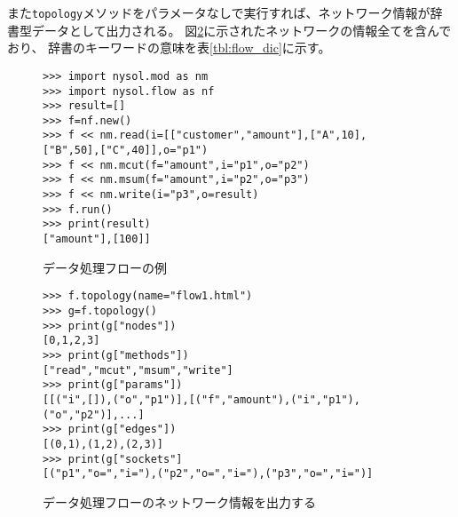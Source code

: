 また\verb|topology|メソッドをパラメータなしで実行すれば、ネットワーク情報が辞書型データとして出力される。
図\ref{code:flow1_topo}に示されたネットワークの情報全てを含んでおり、
辞書のキーワードの意味を表\ref{tbl:flow_dic}に示す。


\begin{figure}[htbp]
\begin{Verbatim}[baselinestretch=0.7,frame=single]
>>> import nysol.mod as nm
>>> import nysol.flow as nf
>>> result=[]
>>> f=nf.new()
>>> f << nm.read(i=[["customer","amount"],["A",10],["B",50],["C",40]],o="p1")
>>> f << nm.mcut(f="amount",i="p1",o="p2")
>>> f << nm.msum(f="amount",i="p2",o="p3")
>>> f << nm.write(i="p3",o=result)
>>> f.run()
>>> print(result)
["amount"],[100]]
\end{Verbatim}
\caption{データ処理フローの例\label{code:flow1}}
\end{figure}

\begin{figure}[htbp]
\begin{Verbatim}[baselinestretch=0.7,frame=single]
>>> f.topology(name="flow1.html")
>>> g=f.topology()
>>> print(g["nodes"])
[0,1,2,3]
>>> print(g["methods"])
["read","mcut","msum","write"]
>>> print(g["params"])
[[("i",[]),("o","p1")],[("f","amount"),("i","p1"),("o","p2")],...]
>>> print(g["edges"])
[(0,1),(1,2),(2,3)]
>>> print(g["sockets"]
[("p1","o=","i="),("p2","o=","i="),("p3","o=","i=")]
\end{Verbatim}
\caption{データ処理フローのネットワーク情報を出力する\label{code:flow1_topo}}
\end{figure}

